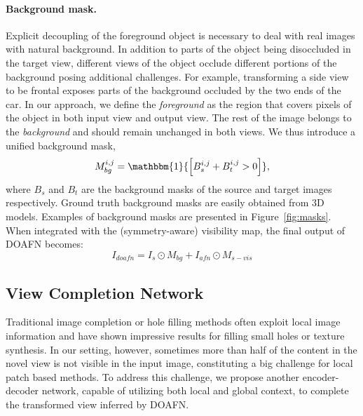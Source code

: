 \documentclass[10pt,twocolumn,letterpaper]{article}
\begin{document}
\paragraph{Background mask.}
Explicit decoupling of the foreground object is necessary to deal with real images with natural background. In addition to parts of the object being disoccluded in the target view, different views of the object occlude different portions of the background posing additional challenges. For example, transforming a side view to be frontal exposes parts of the background occluded by the two ends of the car. In our approach, we define the \emph{foreground} as the region that covers pixels of the object in both input view and output view. The rest of the image belongs to the \emph{background} and should remain unchanged in both views. We thus introduce a unified background mask, 
\begin{equation}
M_{bg}^{i,j} = \mathbbm{1}{\left[ B_s^{i,j} + B_t^{i,j} > 0 \right]},
\end{equation}
where $B_s$ and $B_t$ are the background masks of the source and target images respectively. Ground truth background masks are easily obtained from 3D models. Examples of background masks are presented in Figure~\ref{fig:masks}.
%
When integrated with the (symmetry-aware) visibility map, the final output of DOAFN becomes:
\begin{equation}
I_{doafn} = I_{s} \odot M_{bg} + I_{afn} \odot M_{s-vis}
\end{equation}

\vspace{-2mm}
\subsection{View Completion Network}
\label{sec:comp}
Traditional image completion or hole filling methods often exploit local image information \cite{efros_siggraph2001,barnes_siggraph2009,wexler_tpami2007} and have shown impressive results for filling small holes or texture synthesis. In our setting, however, sometimes more than half of the content in the novel view is not visible in the input image, constituting a big challenge for local patch based methods. To address this challenge, we propose another encoder-decoder network, capable of utilizing both local and global context, to complete the transformed view inferred by DOAFN.
\end{document}
